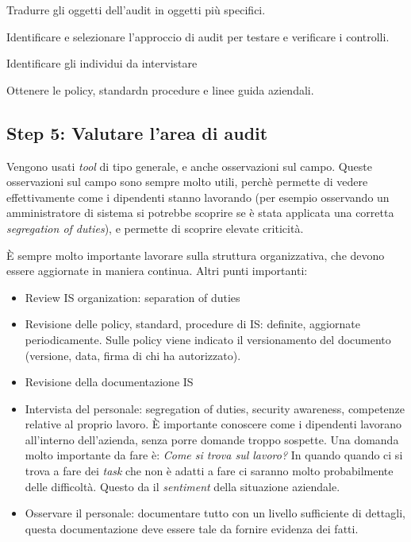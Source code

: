 Tradurre gli oggetti dell'audit in oggetti più specifici.

Identificare e selezionare l'approccio di audit per testare e verificare i 
controlli.

Identificare gli individui da intervistare

Ottenere le policy, standardn procedure e linee guida aziendali.


\subsection{Step 5: Valutare l'area di audit}

Vengono usati \textit{tool} di tipo generale, e anche osservazioni sul campo. 
Queste osservazioni sul campo sono sempre molto utili, perchè permette di 
vedere effettivamente come i dipendenti stanno lavorando (per esempio osservando 
un amministratore di sistema si potrebbe scoprire se è stata applicata una 
corretta \textit{segregation of duties}), e permette di scoprire elevate 
criticità.


È sempre molto importante lavorare sulla struttura organizzativa, che devono 
essere aggiornate in maniera continua.
Altri punti importanti:
\begin{itemize}
\item Review IS organization: separation of duties
\item Revisione delle policy, standard, procedure di IS: definite, aggiornate 
periodicamente. Sulle policy viene indicato il versionamento del documento 
(versione, data, firma di chi ha autorizzato).
\item Revisione della documentazione IS
\item Intervista del personale: segregation of duties, security awareness, 
competenze relative al proprio lavoro. È importante conoscere come i dipendenti 
lavorano all'interno dell'azienda, senza porre domande troppo sospette. Una 
domanda molto importante da fare è: \textit{Come si trova sul lavoro?} In 
quando quando ci si trova a fare dei \textit{task} che non è adatti a fare ci 
saranno molto probabilmente delle difficoltà. Questo da il \textit{sentiment} 
della situazione aziendale.
\item Osservare il personale: documentare tutto 
con un livello sufficiente di dettagli, questa documentazione deve essere tale 
da fornire evidenza dei fatti.

\end{itemize}


